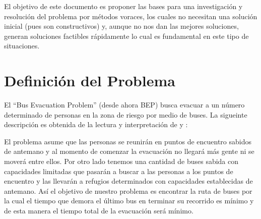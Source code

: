\documentclass[letter, 10pt]{article}
\begin{document}
    El objetivo de este documento es proponer las bases para una 
    investigación y resolución del problema por métodos voraces, los cuales no
    necesitan una solución inicial (pues son constructivos) y, aunque no nos dan
    las mejores soluciones, generan soluciones factibles rápidamente lo cual es
    fundamental en este tipo de situaciones.

\section{Definición del Problema}\label{sec:def}
    El ``Bus Evacuation Problem'' (desde ahora BEP) busca evacuar a un número
    determinado de personas en la zona de riesgo por medio de buses. La
    sigueinte descripción es obtenida de la lectura y interpretación de 
    \cite{bish2011planning} y \cite{goerigk2013branch}:
    
    El problema asume que las personas se reunirán en puntos de encuentro
    sabidos de antemano y al momento de comenzar la evacuación no llegará más
    gente ni se moverá entre ellos. Por otro lado tenemos una
    cantidad de buses sabida con capacidades limitadas que pasarán a buscar a
    las personas a los puntos de encuentro y las llevarán a refugios
    determinados con capacidades establecidas de antemano.
    Así el objetivo de nuestro problema es encontrar la ruta de buses por la
    cual el tiempo que demora el último bus en terminar su recorrido es mínimo y
    de esta manera el tiempo total de la evacuación será mínimo.
\end{document}
